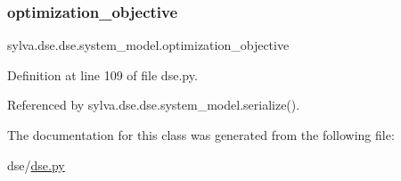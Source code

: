 \mbox{\label{classsylva_1_1dse_1_1dse_1_1system__model_acdb0fd58cbe5281c46488bd3981edc19}} 
\subsubsection{\texorpdfstring{optimization\+\_\+objective}{optimization\_objective}}
{\footnotesize\ttfamily sylva.\+dse.\+dse.\+system\+\_\+model.\+optimization\+\_\+objective}



Definition at line 109 of file dse.\+py.



Referenced by sylva.\+dse.\+dse.\+system\+\_\+model.\+serialize().



The documentation for this class was generated from the following file\+:\begin{DoxyCompactItemize}
\item 
dse/\hyperlink{dse_8py}{dse.\+py}\end{DoxyCompactItemize}
